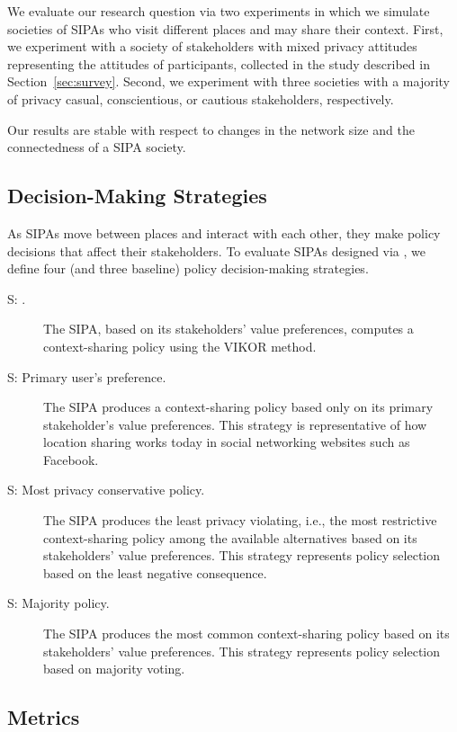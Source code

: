 We evaluate our research question via two experiments in which we simulate societies of \locationapp SIPAs who visit different places and may share their context. First, we experiment with a society of stakeholders with mixed privacy attitudes representing the attitudes of participants, collected in the study described in Section~\ref{sec:survey}. Second, we experiment with three societies with a majority of privacy casual, conscientious, or cautious stakeholders, respectively.

Our results are stable with respect to changes in the network size and the connectedness of a SIPA society. 

\subsection{Decision-Making Strategies}
\label{sec:decision-making-strategies}

As \locationapp SIPAs move between places and interact with each other, they make policy decisions that affect their stakeholders. To evaluate SIPAs designed via \frameworkAinur, we define four (\frameworkAinur and three baseline) policy decision-making strategies. 

\begin{description}
\item[S\fsub{\frameworkAinur}: \frameworkAinur.] The SIPA, based on its stakeholders' value preferences, computes a context-sharing policy using the VIKOR method.
\item[S: Primary user's preference.] The SIPA produces a context-sharing policy based only on its primary stakeholder's value preferences. This strategy is representative of how location sharing works today in social networking websites such as Facebook. 
\item[S: Most privacy conservative policy.] The SIPA produces the least privacy violating, i.e., the most restrictive context-sharing policy among the available alternatives based on its stakeholders' value preferences. This strategy represents policy selection based on the least negative consequence. 
\item[S: Majority policy.] The SIPA produces the most common context-sharing policy based on its stakeholders' value preferences. This strategy represents policy selection based on majority voting. 
\end{description}

\subsection{Metrics}

